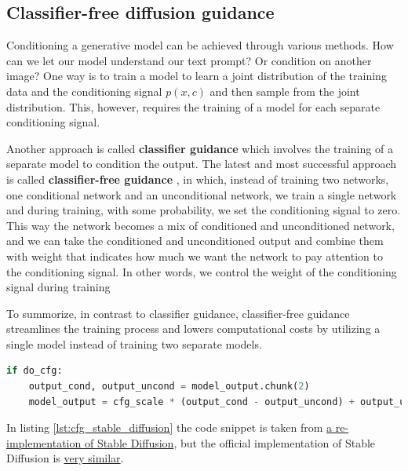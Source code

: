 \subsection{Classifier-free diffusion guidance}

\label{subsec:classifier_free_diffusion_guidance}

Conditioning a generative model can be achieved through various methods. How can we let our model understand our text prompt? Or condition on another image? One way is to train a model to learn a joint distribution of the training data and the conditioning signal $p(x,c)$ and then sample from the joint distribution. This, however, requires the training of a model for each separate conditioning signal.

Another approach is called \textbf{classifier guidance} \cite{openai_diffusion_beats_gans} which involves the training of a separate model to condition the output. The latest and most successful approach is called \textbf{classifier-free guidance} \cite{classifier_free_guidance}, in which, instead of training two networks, one conditional network and an unconditional network, we train a single network and during training, with some probability, we set the conditioning signal to zero. This way the network becomes a mix of conditioned and unconditioned network, and we can take the conditioned and unconditioned output and combine them with weight that indicates how much we want the network to pay attention to the conditioning signal. In other words, we control the weight of the conditioning signal during training 

To summorize, in contrast to classifier guidance, classifier-free guidance streamlines the training process and lowers computational costs by utilizing a single model instead of training two separate models.

\begin{lstlisting}[language=Python, caption={Classifier-free guidance (CFG) in Stable Diffusion. The CFG scale is the weight of the conditioning signal.}, label={lst:cfg_stable_diffusion}]
if do_cfg:
    output_cond, output_uncond = model_output.chunk(2)
    model_output = cfg_scale * (output_cond - output_uncond) + output_uncond
\end{lstlisting}

In listing \ref{lst:cfg_stable_diffusion} the code snippet is taken from \href{https://github.com/hkproj/pytorch-stable-diffusion/blob/e0cb06de011787cdf13eed7b4287ad8410491149/sd/pipeline.py#L131C1-L132C1}{a re-implementation of Stable Diffusion}, but the official implementation of Stable Diffusion is \href{https://github.com/CompVis/stable-diffusion/blob/21f890f9da3cfbeaba8e2ac3c425ee9e998d5229/ldm/models/diffusion/ddim.py#L178C1-L179C1}{very similar}.








